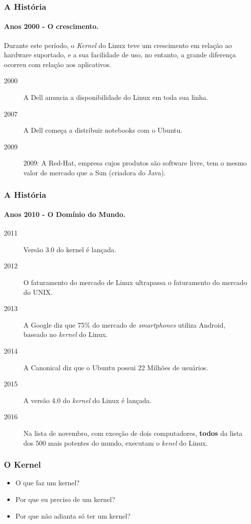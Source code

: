 \documentclass[aspectratio=169,14pt]{beamer}
\begin{document}
\begin{frame}
    \frametitle{A História}
    \framesubtitle{Anos 2000 - O crescimento.}
    Durante este período, o \emph{Kernel} do Linux teve um crescimento em
    relação ao hardware suportado, e a sua facilidade de uso, no entanto,
    a grande diferença ocorreu com relação aos aplicativos.
    \vspace{1em}
    \begin{description}
        \item[2000]{A Dell anuncia a disponibilidade do Linux em toda sua linha.}
        \item[2007]{A Dell começa a distribuir notebooks com o Ubuntu.}
        \item[2009]{2009: A Red-Hat, empresa cujos produtos são software
        livre, tem o mesmo valor de mercado que a Sun (criadora do Java).}
    \end{description}
\end{frame}

\begin{frame}
    \frametitle{A História}
    \framesubtitle{Anos 2010 - O Domínio do Mundo.}
    \begin{description}
        \item[2011]{Versão 3.0 do kernel é lançada.}
        \item[2012]{O faturamento do mercado de Linux ultrapassa o
        faturamento do mercado do UNIX.}
        \item[2013]{A Google diz que 75\% do mercado de \emph{smartphones}
        utiliza Android, baseado no \emph{kernel} do Linux.}
        \item[2014]{A Canonical diz que o Ubuntu possui 22 Milhões de
        usuários.}
        \item[2015]{A versão 4.0 do \emph{kernel} do Linux é lançada.}
        \item[2016]{Na lista de novembro, com exceção de
        dois computadores, \textbf{todos} da lista dos 500 mais potentes
        do mundo, executam o \textit{kenel} do Linux.}
    \end{description}
\end{frame}

\begin{frame}
    \frametitle{O Kernel}
    \begin{itemize}
        \item O que faz um kernel?
        \item Por que eu preciso de um kernel?
        \item Por que não adianta só ter um kernel?
    \end{itemize}
\end{frame}
\end{document}
